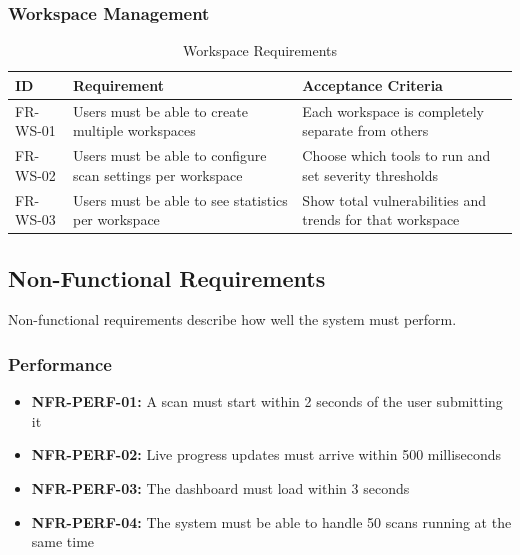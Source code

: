 \documentclass[12pt,a4paper]{report}
\begin{document}
\subsubsection{Workspace Management}

\begin{table}[H]
\centering
\caption{Workspace Requirements}
\label{tab:workspace_requirements}
\begin{tabular}{|p{2cm}|p{5cm}|p{5cm}|}
\hline
\textbf{ID} & \textbf{Requirement} & \textbf{Acceptance Criteria} \\
\hline
FR-WS-01 & Users must be able to create multiple workspaces & Each workspace is completely separate from others \\
\hline
FR-WS-02 & Users must be able to configure scan settings per workspace & Choose which tools to run and set severity thresholds \\
\hline
FR-WS-03 & Users must be able to see statistics per workspace & Show total vulnerabilities and trends for that workspace \\
\hline
\end{tabular}
\end{table}

\subsection{Non-Functional Requirements}

Non-functional requirements describe how well the system must perform.

\subsubsection{Performance}
\begin{itemize}
    \item \textbf{NFR-PERF-01:} A scan must start within 2 seconds of the user submitting it
    \item \textbf{NFR-PERF-02:} Live progress updates must arrive within 500 milliseconds
    \item \textbf{NFR-PERF-03:} The dashboard must load within 3 seconds
    \item \textbf{NFR-PERF-04:} The system must be able to handle 50 scans running at the same time
\end{itemize}
\end{document}
